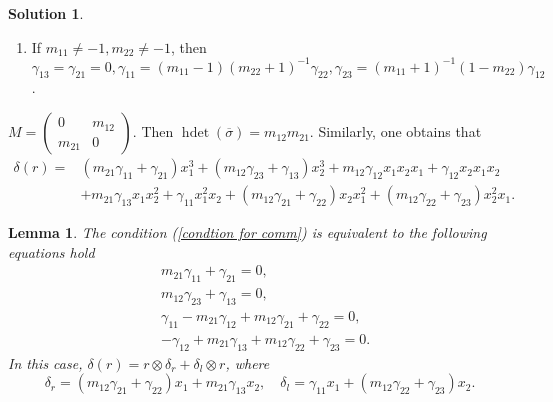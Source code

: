 \documentclass[a4paper,10pt]{amsart}
\newtheorem{lemma}[theorem]{Lemma}
\theoremstyle{definition}
\newtheorem{solution}[theorem]{Solution}
\numberwithin{equation}{section}
\DeclareMathOperator{\hdet}{hdet}
\begin{document}
\begin{solution}
\begin{enumerate}
    \item  If $m_{11}\neq-1,m_{22}\neq- 1$, then $\gamma_{13}=\gamma_{21}=0,\gamma_{11}=(m_{11}-1)(m_{22}+1)^{-1}\gamma_{22}, \gamma_{23}=(m_{11}+1)^{-1}(1-m_{22})\gamma_{12}$.  %

\end{enumerate}
\end{solution}

 $M=
\left(
\begin{array}{cc}
0  & m_{12}\\
m_{21}   &0
\end{array}
\right).$  Then $\hdet(\overline{\sigma})=m_{12}m_{21}$. Similarly, one obtains that
\begin{align*}
\delta(r)=&(m_{21}\gamma_{11}+\gamma_{21})x_1^3+(m_{12}\gamma_{23}+\gamma_{13})x_2^3+m_{12}\gamma_{12}x_1x_2x_1+\gamma_{12}x_2x_1x_2\\
&+m_{21}\gamma_{13}x_1x_2^2+\gamma_{11}x_1^2x_2+(m_{12}\gamma_{21}+\gamma_{22})x_2x_1^2+(m_{12}\gamma_{22}+\gamma_{23})x_2^2x_1.
\end{align*}
\begin{lemma}
The condition (\ref{condtion for comm}) is equivalent to the following equations hold
\begin{equation}\label{equation for q=-1 II}
\begin{aligned}
&m_{21}\gamma_{11}+\gamma_{21}=0,\\
&m_{12}\gamma_{23}+\gamma_{13}=0,\\
&\gamma_{11}-m_{21}\gamma_{12}+m_{12}\gamma_{21}+\gamma_{22}=0,\\
&-\gamma_{12}+m_{21}\gamma_{13}+m_{12}\gamma_{22}+\gamma_{23}=0.
\end{aligned}
\end{equation}
In this case, $\delta(r)=r\otimes \delta_r+\delta_l\otimes r$, where
\begin{equation*}\label{delta_l,r for qneq-1}
\delta_{r}=(m_{12}\gamma_{21}+\gamma_{22})x_1+m_{21}\gamma_{13}x_2,\quad
\delta_{l}=\gamma_{11}x_1+(m_{12}\gamma_{22}+\gamma_{23})x_2.
\end{equation*}
\end{lemma}
\end{document}
